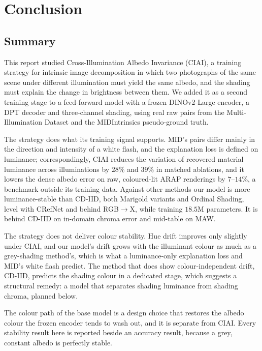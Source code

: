 \chapter{Conclusion}
\label{ch:conclusion}

\section{Summary}

This report studied Cross-Illumination Albedo Invariance (CIAI), a training strategy for
intrinsic image decomposition in which two photographs of the same scene under different
illumination must yield the same albedo, and the shading must explain the change in
brightness between them. We added it as a second training stage to a feed-forward model
with a frozen DINOv2-Large encoder, a DPT decoder and three-channel shading, using real
raw pairs from the Multi-Illumination Dataset and the MIDIntrinsics pseudo-ground truth.

The strategy does what its training signal supports. MID's pairs differ mainly in the
direction and intensity of a white flash, and the explanation loss is defined on
luminance; correspondingly, CIAI reduces the variation of recovered material luminance
across illuminations by $28\%$ and $39\%$ in matched ablations, and it lowers the dense
albedo error on raw, coloured-lit ARAP renderings by $7$--$14\%$, a benchmark outside its
training data. Against other methods our model is more luminance-stable than CD-IID, both
Marigold variants and Ordinal Shading, level with CRefNet and behind RGB$\rightarrow$X, while
training $18.5$M parameters. It is behind CD-IID on in-domain chroma error and mid-table on
MAW.

The strategy does not deliver colour stability. Hue drift improves only slightly under
CIAI, and our model's drift grows with the illuminant colour as much as a grey-shading
method's, which is what a luminance-only explanation loss and MID's white flash predict. The
method that does show colour-independent drift, CD-IID, predicts the shading colour in a
dedicated stage, which suggests a structural remedy: a model that separates shading
luminance from shading chroma, planned below.

The colour path of the base model is a design choice that restores the albedo colour the
frozen encoder tends to wash out, and it is separate from CIAI. Every stability result here
is reported beside an accuracy result, because a grey, constant albedo is perfectly stable.


